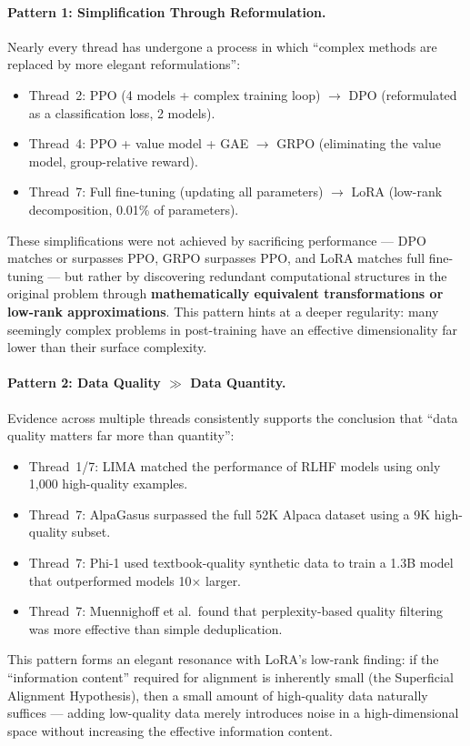 \paragraph{Pattern 1: Simplification Through Reformulation.}
Nearly every thread has undergone a process in which ``complex methods are replaced by more elegant reformulations'':
\begin{itemize}[leftmargin=2em]
  \item Thread~2: PPO (4 models + complex training loop)
    $\rightarrow$ DPO (reformulated as a classification loss, 2 models).
  \item Thread~4: PPO + value model + GAE
    $\rightarrow$ GRPO (eliminating the value model, group-relative reward).
  \item Thread~7: Full fine-tuning (updating all parameters)
    $\rightarrow$ LoRA (low-rank decomposition, 0.01\% of parameters).
\end{itemize}
These simplifications were not achieved by sacrificing performance ---
DPO matches or surpasses PPO, GRPO surpasses PPO, and LoRA matches full fine-tuning ---
but rather by discovering redundant computational structures in the original problem
through \textbf{mathematically equivalent transformations or low-rank approximations}.
This pattern hints at a deeper regularity:
many seemingly complex problems in post-training
have an effective dimensionality far lower than their surface complexity.

\paragraph{Pattern 2: Data Quality $\gg$ Data Quantity.}
Evidence across multiple threads consistently supports the conclusion that ``data quality matters far more than quantity'':
\begin{itemize}[leftmargin=2em]
  \item Thread~1/7: LIMA matched the performance of RLHF models using only 1,000 high-quality examples.
  \item Thread~7: AlpaGasus surpassed the full 52K Alpaca dataset using a 9K high-quality subset.
  \item Thread~7: Phi-1 used textbook-quality synthetic data to train a 1.3B model that outperformed
    models 10$\times$ larger.
  \item Thread~7: Muennighoff et al.\ found that perplexity-based quality filtering
    was more effective than simple deduplication.
\end{itemize}
This pattern forms an elegant resonance with LoRA's low-rank finding:
if the ``information content'' required for alignment is inherently small (the Superficial Alignment Hypothesis),
then a small amount of high-quality data naturally suffices ---
adding low-quality data merely introduces noise in a high-dimensional space
without increasing the effective information content.

